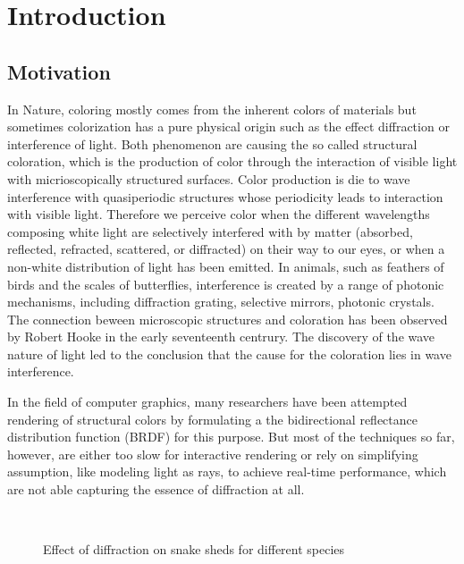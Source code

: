 \chapter{Introduction}
\section{Motivation}
In Nature, coloring mostly comes from the inherent colors of materials but sometimes colorization has a pure physical origin such as the effect diffraction or interference of light. Both phenomenon are causing the so called structural coloration, which is the production of color through the interaction of visible light with micrioscopically structured surfaces. 
Color production is die to wave interference with quasiperiodic structures whose periodicity leads to interaction with visible light. Therefore we perceive color when the different wavelengths composing white light are selectively interfered with by matter (absorbed, reflected, refracted, scattered, or diffracted) on their way to our eyes, or when a non-white distribution of light has been emitted.
In animals, such as feathers of birds and the scales of butterflies, interference is created by a range of photonic mechanisms, including diffraction grating, selective mirrors, photonic crystals.
The connection beween microscopic structures and coloration has been observed by Robert Hooke in the early seventeenth centrury. The discovery of the wave nature of light led to the conclusion that the cause for the coloration lies in wave interference.

In the field of computer graphics, many researchers have been attempted rendering of structural colors by formulating a the bidirectional reflectance distribution function (BRDF) for this purpose. But most of the techniques so far, however, are either too slow for interactive rendering or rely on simplifying assumption, like modeling light as rays, to achieve real-time performance, which are not able capturing the essence of diffraction at all. 

\begin{figure}[H]
  \centering
~
  \label{fig:snakespecies}
  \caption{Effect of diffraction on snake sheds for different species}
\end{figure}

